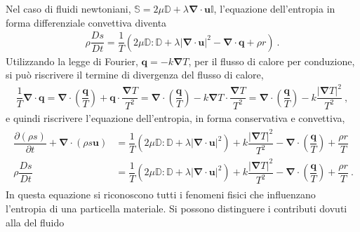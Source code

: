\documentclass[letterpaper,10pt,italian]{jupyterBook}
\begin{document}
\sphinxAtStartPar
Nel caso di fluidi newtoniani,
\(\mathbb{S} = 2\mu\mathbb{D} + \lambda\mathbf{\nabla} \cdot \mathbf{u} \mathbb{I}\),
l’equazione dell’entropia in forma differenziale convettiva diventa
\begin{equation*}
\begin{split}\rho \dfrac{D s}{D t} = \dfrac{1}{T} \left( 2 \mu \mathbb{D} : \mathbb{D} + \lambda |\mathbf{\nabla} \cdot \mathbf{u}|^2 - \mathbf{\nabla} \cdot \mathbf{q} + \rho r \right) \ .\end{split}
\end{equation*}
\sphinxAtStartPar
Utilizzando la legge di Fourier, \(\mathbf{q} = -k \mathbf{\nabla} T\), per il
flusso di calore per conduzione, si può riscrivere il termine di
divergenza del flusso di calore,
\begin{equation*}
\begin{split}\dfrac{1}{T} \mathbf{\nabla} \cdot \mathbf{q} =
  \mathbf{\nabla} \cdot \left( \dfrac{\mathbf{q}}{T} \right) + \mathbf{q} \cdot \dfrac{\mathbf{\nabla} T}{T^2} =
  \mathbf{\nabla} \cdot \left( \dfrac{\mathbf{q}}{T} \right) - k \mathbf{\nabla}{T} \cdot \dfrac{\mathbf{\nabla} T}{T^2} =
  \mathbf{\nabla} \cdot \left( \dfrac{\mathbf{q}}{T} \right) - k \dfrac{|\mathbf{\nabla} T|^2}{T^2} \ ,\end{split}
\end{equation*}
\sphinxAtStartPar
e quindi riscrivere l’equazione dell’entropia, in forma conservativa e
convettiva,
\begin{equation*}
\begin{split}\begin{aligned}
 \dfrac{\partial (\rho s)}{\partial t} + \mathbf{\nabla} \cdot (\rho s \mathbf{u} ) & = \dfrac{1}{T} \left( 2 \mu \mathbb{D} : \mathbb{D} + \lambda |\mathbf{\nabla} \cdot \mathbf{u}|^2 \right) + k \dfrac{|\mathbf{\nabla}T|^2}{T^2} - \mathbf{\nabla} \cdot \left( \dfrac{\mathbf{q}}{T} \right) + \dfrac{\rho r}{T} \\
 \rho \dfrac{D s}{D t} & = \dfrac{1}{T} \left( 2 \mu \mathbb{D} : \mathbb{D} + \lambda |\mathbf{\nabla} \cdot \mathbf{u}|^2 \right) + k \dfrac{|\mathbf{\nabla}T|^2}{T^2} - \mathbf{\nabla} \cdot \left( \dfrac{\mathbf{q}}{T} \right) + \dfrac{\rho r}{T}  \ .
\end{aligned}\end{split}
\end{equation*}
\sphinxAtStartPar
In questa equazione si riconoscono tutti i fenomeni fisici che
influenzano l’entropia di una particella materiale. Si possono
distinguere i contributi dovuti alla  del fluido
\end{document}
